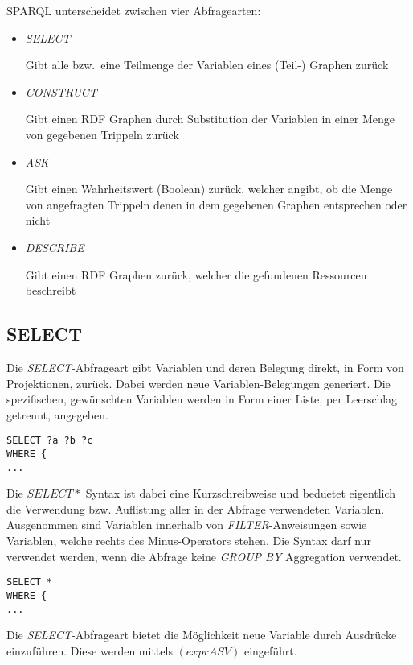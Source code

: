 SPARQL unterscheidet zwischen vier Abfragearten:
\begin{itemize}
    \item \textit{SELECT}

        Gibt alle bzw.\ eine Teilmenge der Variablen eines (Teil-) Graphen zurück
    \item \textit{CONSTRUCT}

        Gibt einen RDF Graphen durch Substitution der Variablen in einer Menge von gegebenen Trippeln zurück
    \item \textit{ASK}

        Gibt einen Wahrheitswert (Boolean) zurück, welcher angibt, ob die Menge von angefragten Trippeln denen in dem gegebenen Graphen entsprechen oder nicht
    \item \textit{DESCRIBE}

        Gibt einen RDF Graphen zurück, welcher die gefundenen Ressourcen beschreibt
\end{itemize}

\subsection{SELECT}
\label{subsec:sparql_abfragearten_select}
Die \textit{SELECT}-Abfrageart gibt Variablen und deren Belegung direkt, in Form von Projektionen, zurück. Dabei werden neue Variablen-Belegungen generiert. Die spezifischen, gewünschten Variablen werden in Form einer Liste, per Leerschlag getrennt, angegeben.

\begin{lstlisting}
SELECT ?a ?b ?c
WHERE {
...
\end{lstlisting}

Die $ SELECT * $ Syntax ist dabei eine Kurzschreibweise und beduetet eigentlich die Verwendung bzw. Auflistung aller in der Abfrage verwendeten Variablen. Ausgenommen sind Variablen innerhalb von \textit{FILTER}-Anweisungen sowie Variablen, welche rechts des Minus-Operators stehen. Die Syntax darf nur verwendet werden, wenn die Abfrage keine \textit{GROUP BY} Aggregation verwendet.
\begin{lstlisting}
SELECT *
WHERE {
...
\end{lstlisting}

Die \textit{SELECT}-Abfrageart bietet die Möglichkeit neue Variable durch Ausdrücke einzuführen. Diese werden mittels $(expr AS V)$ eingeführt.

